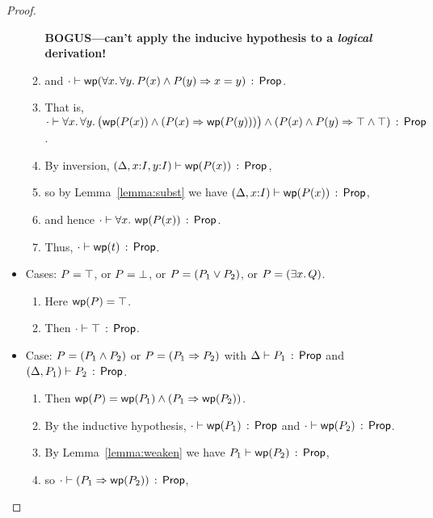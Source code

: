 \documentclass[10pt,letter]{article}
\begin{document}
\begin{proof}
\begin{itemize}
\begin{enumerate}
{\bf BOGUS---can't apply the inducive hypothesis to a {\it logical} derivation!
}
      \item 
      	and
        $\cdot \vdash \mathop{\mathsf{wp}}(\forall x.\, \forall y.\, P(x) \wedge P(y) \Rightarrow x=y)\, :\, \mathsf{Prop}$.
      \item
      	That is, 
	$\cdot \vdash \forall x.\, \forall y.\, \bigl(\mathop{\mathsf{wp}}(P(x)) \wedge (P(x) \Rightarrow \mathop{\mathsf{wp}}(P(y)))\bigr) \wedge (P(x) \wedge P(y) \Rightarrow \top \wedge \top)\, :\, \mathsf{Prop}$.
	  \item
	    By inversion, 
	      $(\Delta,x{:}I,y{:}I) \vdash \mathop{\mathsf{wp}}(P(x))\, :\, \mathsf{Prop}$,
      \item 
        so by Lemma~\ref{lemma:subst} we have 
        $(\Delta,x{:}I) \vdash \mathop{\mathsf{wp}}(P(x))\, :\, \mathsf{Prop}$,
      \item
        and hence $\cdot \vdash \forall x.\, \mathop{\mathsf{wp}}(P(x))\, :\, \mathsf{Prop}$.
      \item
        Thus, $\cdot \vdash \mathop{\mathsf{wp}}(t)\, :\, \mathsf{Prop}$.
      \end{enumerate}
      
  \item Cases: $P = \top$, or $P = \bot$, or $P=(P_1 \vee P_2)$,
      or $P=(\exists x.\, Q)$.
      \begin{enumerate}
      \item 
      	Here $\mathop{\mathsf{wp}}(P) = \top$.
      \item
        Then $\cdot \vdash \top\, :\, \mathsf{Prop}$.
      \end{enumerate}
            
  \item Case: $P = (P_1 \wedge P_2)$ or $P = (P_1 \Rightarrow P_2)$ with
       $\Delta \vdash P_1\, :\, \mathsf{Prop}$ and 
              $(\Delta,P_1) \vdash P_2\, :\, \mathsf{Prop}$.
       \begin{enumerate}
       \item 
       		Then $\mathop{\mathsf{wp}}(P) = \mathop{\mathsf{wp}}(P_1) \wedge (P_1 \Rightarrow \mathop{\mathsf{wp}}(P_2))$.
       \item 
       		By the inductive hypothesis,
         	$\cdot \vdash \mathop{\mathsf{wp}}(P_1)\, :\, \mathsf{Prop}$
         	and $\cdot \vdash \mathop{\mathsf{wp}}(P_2)\, :\, \mathsf{Prop}$.
       \item 
         By Lemma~\ref{lemma:weaken} we have 
         $P_1 \vdash \mathop{\mathsf{wp}}(P_2)\, :\, \mathsf{Prop}$,
       \item so $\cdot \vdash (P_1 \Rightarrow \mathop{\mathsf{wp}}(P_2))\, :\, \mathsf{Prop}$,



\end{enumerate}
\end{itemize}
\end{proof}
\end{document}

